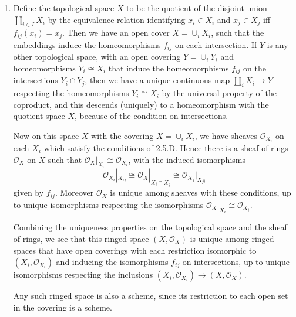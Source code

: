 \documentclass{report}
\renewcommand{\O}{\mathscr{O}} %
\begin{document}
\begin{enumerate}[label=\textbf{4.4.\Alph*.}]
	\item Define the topological space $X$ to be the quotient of the disjoint
	      union $\amalg_{i\in I}X_i$ by the equivalence relation identifying
	      $x_i\in X_i$ and $x_j\in X_j$ iff $f_{ij}(x_i)=x_j$. Then we have an
	      open cover $X=\cup_iX_i$, such that the embeddings induce the
	      homeomorphisms $f_{ij}$ on each intersection. If $Y$ is any other
	      topological space, with an open covering $Y=\cup_iY_i$ and
	      homeomorphisms $Y_i\cong X_i$ that induce the homeomorphisms $f_{ij}$
	      on the intersections $Y_i\cap Y_j$, then we have a unique continuous map
	      $\amalg_iX_i\to Y$ respecting the homeomorphisms $Y_i\cong X_i$ by the
	      universal property of the coproduct, and this descends (uniquely) to a
	      homeomorphism with the quotient space $X$, because of the condition on
	      intersections.

	      Now on this space $X$ with the covering $X=\cup_iX_i$, we have sheaves
	      $\O_{X_i}$ on each $X_i$ which satisfy the conditions of 2.5.D. Hence
	      there is a sheaf of rings $\O_X$ on $X$ such that
	      $\O_X|_{X_i}\cong\O_{X_i}$, with the induced isomorphisms
	      \begin{equation*}
		      \O_{X_i}|_{X_{ij}}
		      \cong \O_X|_{X_i\cap X_j}
		      \cong \O_{X_j}|_{X_{ji}}
	      \end{equation*}
	      given by $f_{ij}$. Moreover $\O_X$ is unique among sheaves with these
	      conditions, up to unique isomorphisms respecting the isomorphisms
	      $\O_X|_{X_i}\cong\O_{X_i}$.

	      Combining the uniqueness properties on the topological space and the
	      sheaf of rings, we see that this ringed space $(X,\O_X)$ is unique among
	      ringed spaces that have open coverings with each restriction isomorphic
	      to $(X_i,\O_{X_i})$ and inducing the isomorphisms $f_{ij}$ on
	      intersections, up to unique isomorphisms respecting the inclusions
	      $(X_i,\O_{X_i})\to(X,\O_X)$.

	      Any such ringed space is also a scheme, since its restriction to each
	      open set in the covering is a scheme.


\end{enumerate}
\end{document}
